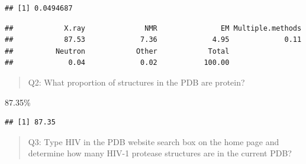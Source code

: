 \documentclass[
]{article}
\newenvironment{Shaded}{\begin{snugshade}}{\end{snugshade}}
\newcommand{\CommentTok}[1]{\textcolor[rgb]{0.56,0.35,0.01}{\textit{#1}}}
\newcommand{\DecValTok}[1]{\textcolor[rgb]{0.00,0.00,0.81}{#1}}
\newcommand{\FunctionTok}[1]{\textcolor[rgb]{0.00,0.00,0.00}{#1}}
\newcommand{\NormalTok}[1]{#1}
\newcommand{\SpecialCharTok}[1]{\textcolor[rgb]{0.00,0.00,0.00}{#1}}
\begin{document}
\begin{Shaded}
\end{Shaded}

\begin{verbatim}
## [1] 0.0494687
\end{verbatim}

\begin{Shaded}
\end{Shaded}

\begin{verbatim}
##            X.ray              NMR               EM Multiple.methods 
##            87.53             7.36             4.95             0.11 
##          Neutron            Other            Total 
##             0.04             0.02           100.00
\end{verbatim}

\begin{quote}
Q2: What proportion of structures in the PDB are protein?
\end{quote}

87.35\%

\begin{Shaded}
\end{Shaded}

\begin{verbatim}
## [1] 87.35
\end{verbatim}

\begin{quote}
Q3: Type HIV in the PDB website search box on the home page and
determine how many HIV-1 protease structures are in the current PDB?
\end{quote}
\end{document}
